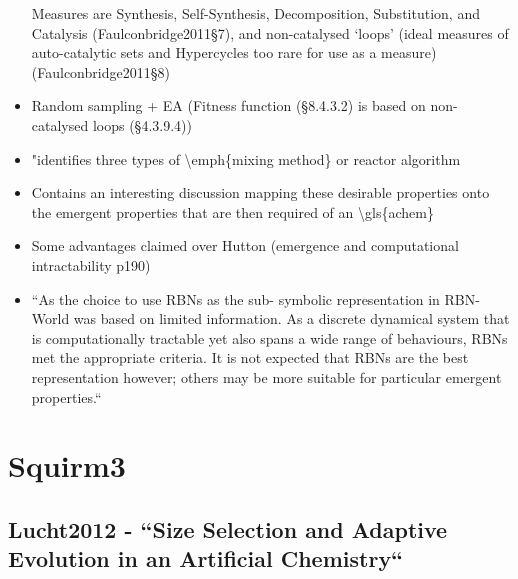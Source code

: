 \begin{itemize}
			Measures are Synthesis, Self-Synthesis, Decomposition, Substitution,
			and Catalysis (Faulconbridge2011§7), and non-catalysed `loops' (ideal
			measures of auto-catalytic sets and Hypercycles too rare for use as a
			measure) (Faulconbridge2011§8)
			
			\item
			
			Random sampling + EA (Fitness function (§8.4.3.2) is based on
			non-catalysed loops (§4.3.9.4))
			
			\item
			
			"identifies three types of \textbackslash{}emph\{mixing method\} or
			reactor algorithm
			
			\item
			
			Contains an interesting discussion mapping these desirable properties
			onto the emergent properties that are then required of an
			\textbackslash{}gls\{achem\}
			
			\item
			
			Some advantages claimed over Hutton (emergence and computational
			intractability p190)
			
			\item
			
			``As the choice to use RBNs as the sub- symbolic representation in
			RBN-World was based on limited information. As a discrete dynamical
			system that is computationally tractable yet also spans a wide range
			of behaviours, RBNs met the appropriate criteria. It is not expected
			that RBNs are the best representation however; others may be more
			suitable for particular emergent properties.``
			
		\end{itemize}
		
		\hypertarget{squirm3}{\section{Squirm3}\label{squirm3}}
		
		\hypertarget{lucht2012---size-selection-and-adaptive-evolution-in-an-artificial-chemistry}{\subsection{Lucht2012
				- ``Size Selection and Adaptive Evolution in an Artificial
				Chemistry``}\label{lucht2012---size-selection-and-adaptive-evolution-in-an-artificial-chemistry}}
		
